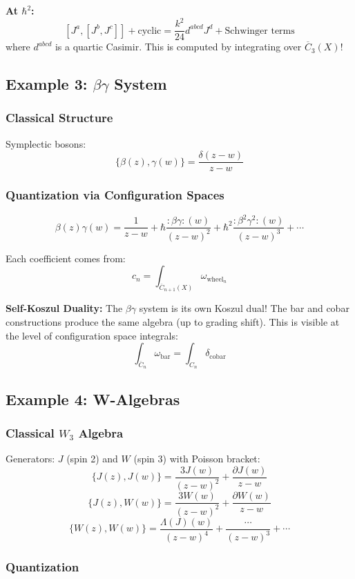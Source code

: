\textbf{At $\hbar^2$:}
$$[J^a, [J^b, J^c]] + \text{cyclic} = \frac{k^2}{24} d^{abcd} J^d + \text{Schwinger terms}$$
where $d^{abcd}$ is a quartic Casimir. This is computed by integrating over $\overline{C}_3(X)$!

\subsection{Example 3: $\beta\gamma$ System}

\subsubsection{Classical Structure}

Symplectic bosons:
$$\{\beta(z), \gamma(w)\} = \frac{\delta(z-w)}{z-w}$$

\subsubsection{Quantization via Configuration Spaces}

$$\beta(z)\gamma(w) = \frac{1}{z-w} + \hbar \frac{:\beta\gamma:(w)}{(z-w)^2} + \hbar^2 \frac{:\beta^2\gamma^2:(w)}{(z-w)^3} + \cdots$$

Each coefficient comes from:
$$c_n = \int_{\overline{C}_{n+1}(X)} \omega_{\text{wheel}_n}$$

\textbf{Self-Koszul Duality:}
The $\beta\gamma$ system is its own Koszul dual! The bar and cobar constructions produce the same algebra (up to grading shift). This is visible at the level of configuration space integrals:
$$\int_{\overline{C}_n} \omega_{\text{bar}} = \int_{C_n} \delta_{\text{cobar}}$$

\subsection{Example 4: W-Algebras}

\subsubsection{Classical $W_3$ Algebra}

Generators: $J$ (spin 2) and $W$ (spin 3) with Poisson bracket:
$$\{J(z), J(w)\} = \frac{3J(w)}{(z-w)^2} + \frac{\partial J(w)}{z-w}$$
$$\{J(z), W(w)\} = \frac{3W(w)}{(z-w)^2} + \frac{\partial W(w)}{z-w}$$
$$\{W(z), W(w)\} = \frac{\Lambda(J)(w)}{(z-w)^4} + \frac{\cdots}{(z-w)^3} + \cdots$$

\subsubsection{Quantization}

